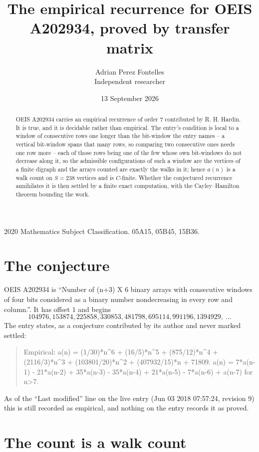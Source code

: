\documentclass[11pt,a4paper]{article}
\title{The empirical recurrence for OEIS A202934, proved by transfer matrix}
\author{Adrian Perez Fontelles\\ \small Independent researcher}
\date{13 September 2026}
\theoremstyle{plain}
\theoremstyle{definition}
\begin{document}
\maketitle

\begin{abstract}
OEIS A202934 carries an empirical recurrence of order $7$ contributed by R. H. Hardin. It is
true, and it is decidable rather than empirical. The entry's condition is local to a window of consecutive rows one longer than the bit-window the entry names -- a vertical bit-window spans that many rows, so comparing two consecutive ones needs one row more -- each of those rows being one of the few whose own bit-windows do not decrease along it, so
the admissible configurations of such a window are the vertices of a finite digraph and the
arrays counted are exactly the walks in it; hence $a(n)$ is a walk count on $S=238$ vertices
and is $C$-finite. Whether the conjectured recurrence annihilates it is then settled by a
finite exact computation, with the Cayley--Hamilton theorem bounding the work.
\end{abstract}

\noindent\small 2020 Mathematics Subject Classification. 05A15, 05B45, 15B36.\normalsize

\section{The conjecture}

OEIS A202934 is ``Number of (n+3) X 6 binary arrays with consecutive windows of four bits considered as a binary number nondecreasing in every row and column.''. It has offset $1$ and begins
\[
104976, 153874, 225858, 330853, 481798, 695114, 991196, 1394929,\ \dots
\]
The entry states, as a conjecture contributed by its author and never marked settled:
\begin{quote}
Empirical: a(n) = (1/30)*n\^{}6 + (16/5)*n\^{}5 + (875/12)*n\^{}4 + (2116/3)*n\^{}3 + (103801/20)*n\^{}2 + (407932/15)*n + 71809. a(n) = 7*a(n-1) - 21*a(n-2) + 35*a(n-3) - 35*a(n-4) + 21*a(n-5) - 7*a(n-6) + a(n-7) for n>7.
\end{quote}
As of the ``Last modified'' line on the live entry (Jun 03 2018 07:57:24, revision 9) this is still
recorded as empirical, and nothing on the entry records it as proved.

\section{The count is a walk count}
\end{document}
